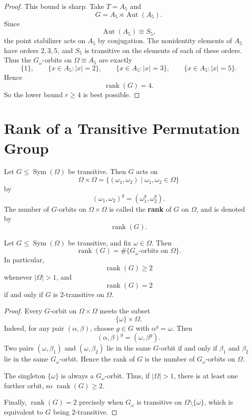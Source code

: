 \begin{proof}
    This bound is sharp. Take \(T=A_5\) and
    \[
    G=A_5\rtimes \operatorname{Aut}(A_5).
    \]
    Since
    \[
    \operatorname{Aut}(A_5)\cong S_5,
    \]
    the point stabilizer acts on \(A_5\) by conjugation. The nonidentity elements of
    \(A_5\) have orders \(2,3,5\), and \(S_5\) is transitive on the elements of each of
    these orders. Thus the \(G_\omega\)-orbits on \(\Omega\cong A_5\) are exactly
    \[
    \{1\},
    \qquad
    \{x\in A_5: |x|=2\},
    \qquad
    \{x\in A_5: |x|=3\},
    \qquad
    \{x\in A_5: |x|=5\}.
    \]
    Hence
    \[
    \operatorname{rank}(G)=4.
    \]
    So the lower bound \(r\geq 4\) is best possible.
    \end{proof}

\section{Rank of a Transitive Permutation Group}

\begin{definition}[Rank]
Let \(G \leq \operatorname{Sym}(\Omega)\) be transitive. Then \(G\) acts on
\[
\Omega \times \Omega
=
\{(\omega_1,\omega_2) \mid \omega_1,\omega_2 \in \Omega\}
\]
by
\[
(\omega_1,\omega_2)^g=(\omega_1^g,\omega_2^g).
\]
The number of \(G\)-orbits on \(\Omega \times \Omega\) is called the
\textbf{rank} of \(G\) on \(\Omega\), and is denoted by
\[
\operatorname{rank}(G).
\]
\end{definition}

\begin{proposition}
Let \(G \leq \operatorname{Sym}(\Omega)\) be transitive, and fix
\(\omega \in \Omega\). Then
\[
\operatorname{rank}(G)
=
\#\{G_\omega\text{-orbits on }\Omega\}.
\]
In particular,
\[
\operatorname{rank}(G)\geq 2
\]
whenever \(|\Omega|>1\), and
\[
\operatorname{rank}(G)=2
\]
if and only if \(G\) is \(2\)-transitive on \(\Omega\).
\end{proposition}

\begin{proof}
Every \(G\)-orbit on \(\Omega \times \Omega\) meets the subset
\[
\{\omega\}\times \Omega.
\]
Indeed, for any pair \((\alpha,\beta)\), choose \(g \in G\) with
\(\alpha^g=\omega\). Then
\[
(\alpha,\beta)^g=(\omega,\beta^g).
\]
Two pairs \((\omega,\beta_1)\) and \((\omega,\beta_2)\) lie in the same
\(G\)-orbit if and only if \(\beta_1\) and \(\beta_2\) lie in the same
\(G_\omega\)-orbit. Hence the rank of \(G\) is the number of
\(G_\omega\)-orbits on \(\Omega\).

The singleton \(\{\omega\}\) is always a \(G_\omega\)-orbit. Thus, if
\(|\Omega|>1\), there is at least one further orbit, so
\(\operatorname{rank}(G)\geq 2\).

Finally, \(\operatorname{rank}(G)=2\) precisely when \(G_\omega\) is transitive on
\(\Omega \setminus \{\omega\}\), which is equivalent to \(G\) being
\(2\)-transitive.
\end{proof}

